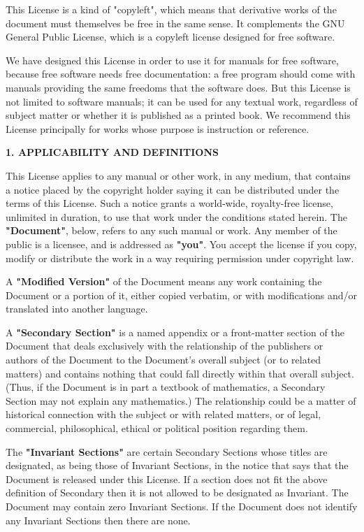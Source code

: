 This License is a kind of "copyleft", which means that derivative
works of the document must themselves be free in the same sense.  It
complements the GNU General Public License, which is a copyleft
license designed for free software.

We have designed this License in order to use it for manuals for free
software, because free software needs free documentation: a free
program should come with manuals providing the same freedoms that the
software does.  But this License is not limited to software manuals;
it can be used for any textual work, regardless of subject matter or
whether it is published as a printed book.  We recommend this License
principally for works whose purpose is instruction or reference.


\begin{center}
{\Large\bf 1. APPLICABILITY AND DEFINITIONS}
\end{center}

This License applies to any manual or other work, in any medium, that
contains a notice placed by the copyright holder saying it can be
distributed under the terms of this License.  Such a notice grants a
world-wide, royalty-free license, unlimited in duration, to use that
work under the conditions stated herein.  The \textbf{"Document"}, below,
refers to any such manual or work.  Any member of the public is a
licensee, and is addressed as \textbf{"you"}.  You accept the license if you
copy, modify or distribute the work in a way requiring permission
under copyright law.

A \textbf{"Modified Version"} of the Document means any work containing the
Document or a portion of it, either copied verbatim, or with
modifications and/or translated into another language.

A \textbf{"Secondary Section"} is a named appendix or a front-matter section of
the Document that deals exclusively with the relationship of the
publishers or authors of the Document to the Document's overall subject
(or to related matters) and contains nothing that could fall directly
within that overall subject.  (Thus, if the Document is in part a
textbook of mathematics, a Secondary Section may not explain any
mathematics.)  The relationship could be a matter of historical
connection with the subject or with related matters, or of legal,
commercial, philosophical, ethical or political position regarding
them.

The \textbf{"Invariant Sections"} are certain Secondary Sections whose titles
are designated, as being those of Invariant Sections, in the notice
that says that the Document is released under this License.  If a
section does not fit the above definition of Secondary then it is not
allowed to be designated as Invariant.  The Document may contain zero
Invariant Sections.  If the Document does not identify any Invariant
Sections then there are none.

